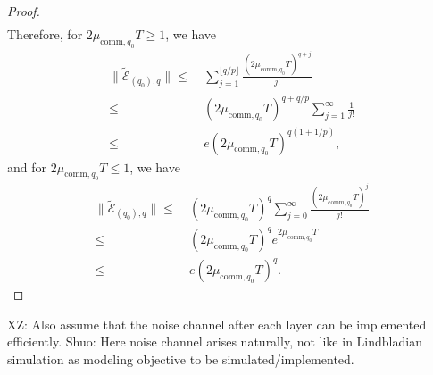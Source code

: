 \documentclass[aps,pra,reprint,groupedaddress,floatfix]{revtex4-2}
\newcommand{\E}{\mathcal{E}}
\newcommand{\xz}[1]{{\color{cyan} XZ: #1}}
\newcommand{\sz}[1]{{\color{blue} Shuo: #1}}
\begin{document}
\begin{proof}
\begin{align*}
\end{align*}
\newpage
		Therefore, for $2\mu_{\mathrm{comm},q_0}T\ge 1$, we have
    \begin{align*}
	    \big\|\tilde{\E}_{(q_0),q}\big\|\le~& \sum_{j=1}^{\lfloor q/p\rfloor }\frac{(2\mu_{\mathrm{comm},q_0}T)^{q+j}}{j!}\\ 
	    \le ~& (2\mu_{\mathrm{comm},q_0}T)^{q+q/p}\sum_{j=1}^{\infty}\frac{1}{j!} \\
        \le ~& e(2\mu_{\mathrm{comm},q_0}T)^{q(1+1/p)} ,
	\end{align*}
	and for $2\mu_{\mathrm{comm},q_0}T\le 1$, we have
    \begin{align*}
	    \big\|\tilde{\E}_{(q_0),q}\big\| \le~&  (2\mu_{\mathrm{comm},q_0}T)^{q}\sum_{j=0}^{\infty}\frac{ (2\mu_{\mathrm{comm},q_0}T)^{j}}{j!}\\
        \le~&  (2\mu_{\mathrm{comm},q_0}T)^{q} e^{2\mu_{\mathrm{comm},q_0}T}\\
        \le~&  e(2\mu_{\mathrm{comm},q_0}T)^{q}.
	\end{align*}
\end{proof}
\xz{Also assume that the noise channel after each layer can be implemented efficiently. }
\sz{Here noise channel arises naturally, not like in Lindbladian simulation as modeling objective to be simulated/implemented.}
\end{document}
